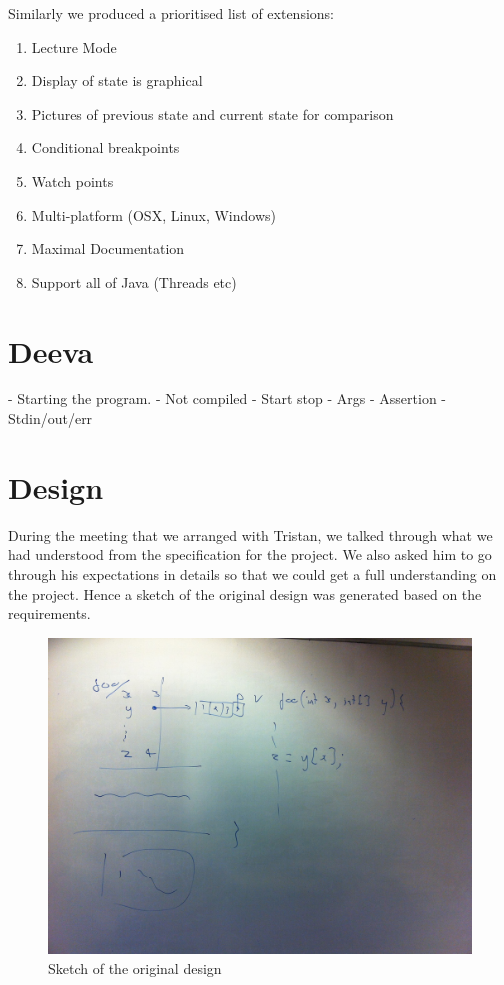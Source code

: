 \documentclass[11pt, a4paper]{article}
\begin{document}
Similarly we produced a prioritised list of extensions:

\begin{enumerate}
\item Lecture Mode
\item Display of state is graphical
\item Pictures of previous state and current state for comparison
\item Conditional breakpoints
\item Watch points
\item Multi-platform (OSX, Linux, Windows)
\item Maximal Documentation
\item Support all of Java (Threads etc)
\end{enumerate}

\section{Deeva}
- Starting the program.
- Not compiled
- Start stop
- Args
- Assertion
- Stdin/out/err


\section{Design}
During the meeting that we arranged with Tristan, we talked through what we had understood from the specification for the project.
We also asked him to go through his expectations in details so that we could get a full understanding on the project.
Hence a sketch of the original design was generated based on the requirements. 
\begin{figure}[h!]
\centering
\includegraphics[width=\textwidth]{sketch.jpg}
\caption{Sketch of the original design}
\label{fig:sketch}
\end{figure}
\end{document}
